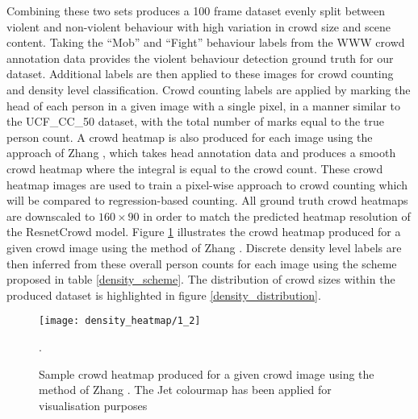 \documentclass[10pt,twocolumn,letterpaper]{article}
\begin{document}
Combining these two sets produces a 100 frame dataset evenly split between violent and non-violent behaviour with high variation in crowd size and scene content. Taking the ``Mob'' and ``Fight'' behaviour labels from the WWW crowd annotation data provides the violent behaviour detection ground truth for our dataset. Additional labels are then applied to these images for crowd counting and density level classification. Crowd counting labels are applied by marking the head of each person in a given image with a single pixel, in a manner similar to the UCF\_CC\_50 dataset, with the total number of marks equal to the true person count. A crowd heatmap is also produced for each image using the approach of Zhang \etal \cite{zhang2016single}, which takes head annotation data and produces a smooth crowd heatmap where the integral is equal to the crowd count. These crowd heatmap images are used to train a pixel-wise approach to crowd counting which will be compared to regression-based counting. All ground truth crowd heatmaps are downscaled to $160 \times 90$ in order to match the predicted heatmap resolution of the ResnetCrowd model. Figure \ref{heatmap_example} illustrates the crowd heatmap produced for a given crowd image using the method of Zhang \etal \cite{zhang2016single}. Discrete density level labels are then inferred from these overall person counts for each image using the scheme proposed in table \ref{density_scheme}. The distribution of crowd sizes within the produced dataset is highlighted in figure \ref{density_distribution}. 

\begin{figure}[h!]
	
    \centering
    \texttt{[image: density\_heatmap/1\_2]}
    
   
	\label{heatmap_example}
    \caption{Sample crowd heatmap produced for a given crowd image using the method of Zhang \etal \cite{zhang2016single}. The Jet colourmap has been applied for visualisation purposes }.
\end{figure}

\begin{table}[h!]


\caption{Density level annotation scheme used during the construction of the Multi Task Crowd dataset}
\label{density_scheme}
\end{table}
\end{document}
